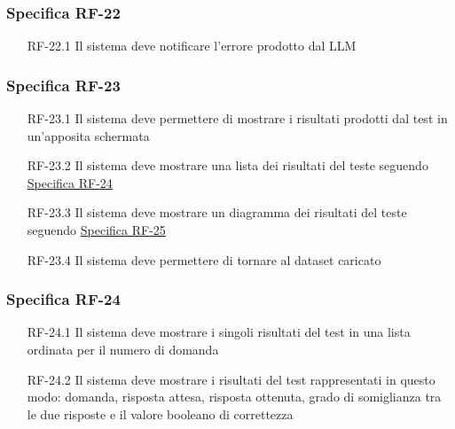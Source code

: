 \subsubsection{Specifica RF-22}
\label{subsubsec:RF-22}
\begin{enumerate}
    \item[RF-22.1] Il sistema deve notificare l'errore prodotto dal LLM
\end{enumerate}

\subsubsection{Specifica RF-23}
\label{subsubsec:RF-23}
\begin{enumerate}
    \item[RF-23.1] Il sistema deve permettere di mostrare i risultati prodotti dal test in un'apposita schermata
    \item[RF-23.2] Il sistema deve mostrare una lista dei risultati del teste seguendo \hyperref[subsubsec:RF-24]{Specifica RF-24}
    \item[RF-23.3] Il sistema deve mostrare un diagramma dei risultati del teste seguendo \hyperref[subsubsec:RF-25]{Specifica RF-25}
    \item[RF-23.4] Il sistema deve permettere di tornare al dataset caricato
\end{enumerate}

\subsubsection{Specifica RF-24}
\label{subsubsec:RF-24}
\begin{enumerate}
    \item[RF-24.1] Il sistema deve mostrare i singoli risultati del test in una lista ordinata per il numero di domanda
    \item[RF-24.2] Il sistema deve mostrare i risultati del test rappresentati in questo modo: domanda, risposta attesa, risposta ottenuta, grado di somiglianza tra le due risposte e il valore booleano di correttezza
\end{enumerate}

